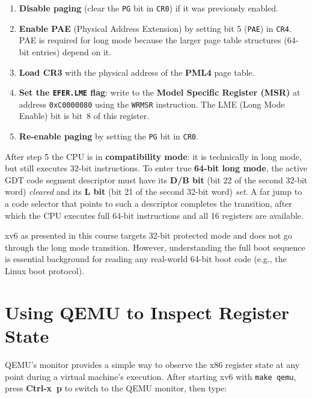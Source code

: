 \documentclass[11pt]{article}
\begin{document}
\begin{enumerate}
    \item \textbf{Disable paging} (clear the \texttt{PG} bit in \texttt{CR0}) if it was
          previously enabled.
    \item \textbf{Enable PAE} (Physical Address Extension) by setting bit 5 (\texttt{PAE})
          in \texttt{CR4}. PAE is required for long mode because the larger page table
          structures (64-bit entries) depend on it.
    \item \textbf{Load CR3} with the physical address of the \textbf{PML4} page table.
    \item \textbf{Set the \texttt{EFER.LME} flag}: write to the
          \textbf{Model Specific Register (MSR)} at address \texttt{0xC0000080} using the
          \texttt{WRMSR} instruction. The LME (Long Mode Enable) bit is bit~8 of this register.
    \item \textbf{Re-enable paging} by setting the \texttt{PG} bit in \texttt{CR0}.
\end{enumerate}

After step 5 the CPU is in \textbf{compatibility mode}: it is technically in long mode, but
still executes 32-bit instructions. To enter true \textbf{64-bit long mode}, the active GDT
code segment descriptor must have its \textbf{D/B bit} (bit 22 of the second 32-bit word)
\emph{cleared} and its \textbf{L bit} (bit 21 of the second 32-bit word) \emph{set}. A far
jump to a code selector that points to such a descriptor completes the transition, after which
the CPU executes full 64-bit instructions and all 16 registers are available.

xv6 as presented in this course targets 32-bit protected mode and does not go through the
long mode transition. However, understanding the full boot sequence is essential background
for reading any real-world 64-bit boot code (e.g., the Linux boot protocol).

\section{Using QEMU to Inspect Register State}

QEMU's monitor provides a simple way to observe the x86 register state at any point during
a virtual machine's execution. After starting xv6 with \texttt{make qemu}, press
\textbf{Ctrl-x~p} to switch to the QEMU monitor, then type:
\end{document}

